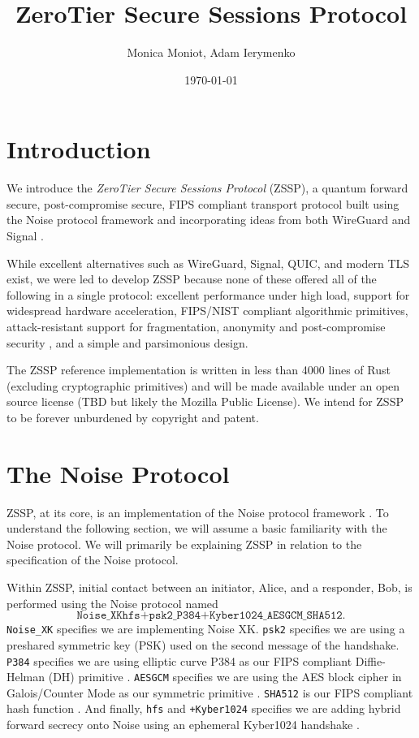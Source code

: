 \documentclass{article}
\title{ZeroTier Secure Sessions Protocol}
\author{Monica Moniot, Adam Ierymenko}
\date{\today}
\begin{document}
\maketitle

\section{Introduction}

We introduce the \emph{ZeroTier Secure Sessions Protocol} (ZSSP), a quantum forward secure, post-compromise secure, FIPS compliant transport protocol built using the Noise protocol framework and incorporating ideas from both WireGuard and Signal \cite{noise_protocol} \cite{wireguard} \cite{signal}.

While excellent alternatives such as WireGuard, Signal, QUIC, and modern TLS exist, we were led to develop ZSSP because none of these offered all of the following in a single protocol: excellent performance under high load, support for widespread hardware acceleration, FIPS/NIST compliant algorithmic primitives, attack-resistant support for fragmentation, anonymity and post-compromise security \cite{post_compromise_security}, and a simple and parsimonious design.

The ZSSP reference implementation is written in less than 4000 lines of Rust (excluding cryptographic primitives) and will be made available under an open source license (TBD but likely the Mozilla Public License). We intend for ZSSP to be forever unburdened by copyright and patent.

\section{The Noise Protocol}\label{sec:transport}

ZSSP, at its core, is an implementation of the Noise protocol framework \cite{noise_protocol}. To understand the following section, we will assume a basic familiarity with the Noise protocol. We will primarily be explaining ZSSP in relation to the specification of the Noise protocol.

Within ZSSP, initial contact between an initiator, Alice, and a responder, Bob, is performed using the Noise protocol named
$$\texttt{Noise\_XKhfs+psk2\_P384+Kyber1024\_AESGCM\_SHA512}.$$
\texttt{Noise\_XK} specifies we are implementing Noise XK. \texttt{psk2} specifies we are using a preshared symmetric key (PSK) used on the second message of the handshake. \texttt{P384} specifies we are using elliptic curve P384 as our FIPS compliant Diffie-Helman (DH) primitive \cite{fips_p384}. \texttt{AESGCM} specifies we are using the AES block cipher in Galois/Counter Mode as our symmetric primitive \cite{fips_aesgcm}. \texttt{SHA512} is our FIPS compliant hash function \cite{fips_sha2}. And finally, \texttt{hfs} and \texttt{+Kyber1024} specifies we are adding hybrid forward secrecy onto Noise using an ephemeral Kyber1024 handshake \cite{kyber}.
\end{document}
